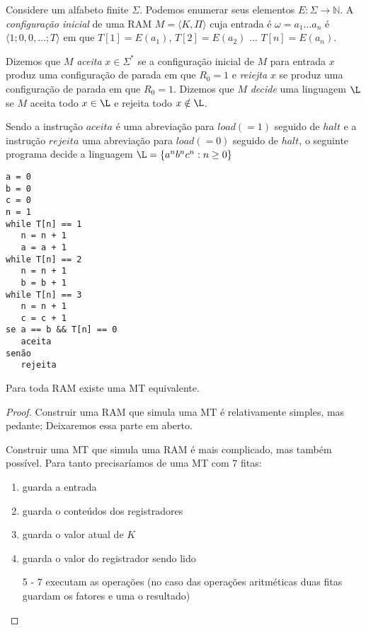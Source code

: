 Considere um alfabeto finite $\Sigma$.
Podemos enumerar seus elementos $E: \Sigma \to \mathbb{N}$.
A {\em configuração inicial} de uma RAM $M = \langle K, \Pi \rangle$ cuja entrada é $\omega = a_1 \dots a_n$ é $\langle 1;0,0, \dots; T \rangle$ em que $T[1] = E(a_1)$, $T[2] =E(a_2)$ $\dots$ $T[n] = E(a_n)$.

Dizemos que $M$ {\em aceita} $x \in \Sigma^*$ se a configuração inicial de $M$ para entrada $x$ produz uma configuração de parada em que $R_0 = 1$ e {\em reiejta} $x$ se produz uma configuração de parada em que $R_0 = 1$.
Dizemos que $M$ {\em decide} uma linguagem $\L$ se $M$ aceita todo $x \in \L$ e rejeita todo $x \notin \L$.

\begin{example}
  Sendo a instrução $aceita$ é uma abreviação para $load(=1)$ seguido de $halt$ e a instrução $rejeita$ uma abreviação para $load(=0)$ seguido de $halt$, o seguinte programa decide a linguagem $\L = \{a^nb^nc^n : n \geq 0 \}$

\begin{verbatim}
a = 0
b = 0
c = 0
n = 1
while T[n] == 1
   n = n + 1
   a = a + 1
while T[n] == 2
   n = n + 1
   b = b + 1
while T[n] == 3
   n = n + 1
   c = c + 1
se a == b && T[n] == 0
   aceita
senão
   rejeita
\end{verbatim}  
\end{example}

\begin{theorem}
  Para toda RAM existe uma MT equivalente.  
\end{theorem}
\begin{proof}
  Construir uma RAM que simula uma MT é relativamente simples, mas pedante;
  Deixaremos essa parte em aberto.

  Construir uma MT que simula uma RAM é mais complicado, mas também possível.
  Para tanto precisaríamos de uma MT com $7$ fitas:
  \begin{enumerate}
  \item guarda a entrada
  \item guarda o conteúdos dos registradores
  \item guarda o valor atual de $K$
  \item guarda o valor do registrador sendo lido
  \item[5 - 7] executam as operações (no caso das operações aritméticas duas fitas guardam os fatores e uma o resultado) 
  \end{enumerate}
\end{proof}

